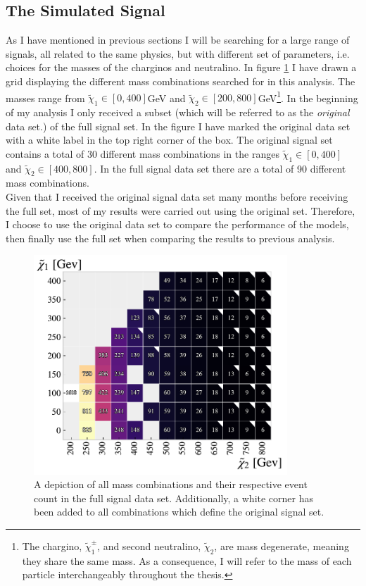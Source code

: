 \subsection{The Simulated Signal}\label{subsec:signal}
As I have mentioned in previous sections I will be searching for a large range of signals, all related to the same
physics, but with different set of parameters, i.e. choices for the masses of the charginos and neutralino. In figure \ref{fig:nrSignal} I have drawn a 
grid displaying the different mass combinations searched for in this analysis. The masses range from ${\tilde{\chi}_1}\in[0,400]$GeV
and ${\tilde{\chi}_2}\in[200,800]$GeV\footnote{The chargino, $\tilde{\chi}^{\pm}_1$, and second neutralino, $\tilde{\chi}_2$, are mass degenerate, 
meaning they share the same mass. As a consequence, I will refer to the mass of each particle interchangeably throughout the thesis.}. In the beginning 
of my analysis I only received a subset (which will be referred to as the \emph{original} data set.) of the full signal set. In the figure I have marked the original data set with a white label in the top 
right corner of the box. The original signal set contains a total of 30 different mass combinations in the ranges 
${\tilde{\chi}_1}\in[0,400]$ and ${\tilde{\chi}_2}\in[400,800]$. In the full signal data set there are a total of 90 different 
mass combinations.
\\
Given that I received the original signal data set many months before receiving the full set, most of my results were carried out using the 
original set. Therefore, I choose to use the original data set to compare the performance of the models, then finally use the full set 
when comparing the results to previous analysis.
\begin{figure}
  \centering
  \includegraphics[width=0.85\textwidth]{Figures/MLResults/NN/SUSY/Grid/NrSignalEvents.pdf}
  \caption{A depiction of all mass combinations and their respective event count in the full signal data set.
  Additionally, a white corner has been added to all combinations which define the original signal set.}
  \label{fig:nrSignal}
\end{figure}
